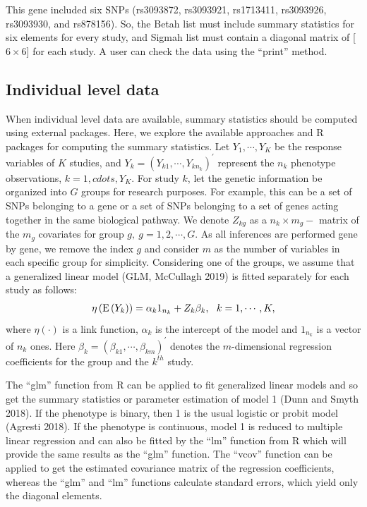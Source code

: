 This gene included six SNPs (rs3093872, rs3093921, rs1713411, rs3093926, rs3093930, and rs878156). So, the Betah list must include summary statistics for six elements for every study, and Sigmah list must contain a diagonal matrix of {[}\(6\times 6\){]} for each study. A user can check the data using the ``print'' method.

\hypertarget{individual-level-data}{%
\subsection{Individual level data}\label{individual-level-data}}

When individual level data are available, summary statistics should be computed using external packages. Here, we explore the available approaches and R packages for computing the summary statistics.
Let \({Y}_1,\cdots,{Y}_K\) be the response variables of \(K\) studies, and \({Y}_k=(Y_{k1},\cdots,Y_{kn_k})^\prime\) represent the \(n_k\) phenotype observations, \(k = 1, cdots, Y_K\). For study \(k\), let the genetic information be organized into \(G\) groups for research purposes. For example, this can be a set of SNPs belonging to a gene or a set of SNPs belonging to a set of genes acting together in the same biological pathway. We denote \({Z}_{kg}\) as a \(n_k\times m_g-\) matrix of the \(m_g\) covariates for group \(g, ~g=1,2,\cdots,G\). As all inferences are performed gene by gene, we remove the index \(g\) and consider \(m\) as the number of variables in each specific group for simplicity. Considering one of the groups, we assume that a generalized linear model (GLM, McCullagh 2019)
is fitted separately for each study as follows:
\begin{eqnarray}\label{e1}
\eta \left({\rm{E}}\left( {{{{Y}}_k}{\rm{ }}} \right)\right) ={\alpha _{k}}{1}_{n_k} + {Z}_{k}{{\beta} _{k}},~~k = 1,\cdots,K,
\end{eqnarray}
where \(\eta(\cdot)\) is a link function, \(\alpha_{k}\) is the intercept of the model and \({1}_{n_k}\) is a vector of \(n_k\) ones. Here \({{\beta}}_{k}=({{\beta}}_{k1},\cdots,{{\beta}}_{km})^\prime\) denotes the \(m\)-dimensional regression coefficients for the group and the \(k^{th}\) study.

The ``glm'' function from R can be applied to fit generalized linear models and so get the summary statistics or parameter estimation of model 1 (Dunn and Smyth 2018).
If the phenotype is binary, then 1 is the usual logistic or probit model (Agresti 2018).
If the phenotype is continuous, model 1 is reduced to multiple linear regression and can also be fitted by the ``lm'' function from R which will provide the same results as the ``glm'' function.
The ``vcov'' function can be applied to get the estimated covariance matrix of the regression coefficients, whereas the ``glm'' and ``lm'' functions calculate standard errors, which yield only the diagonal elements.

